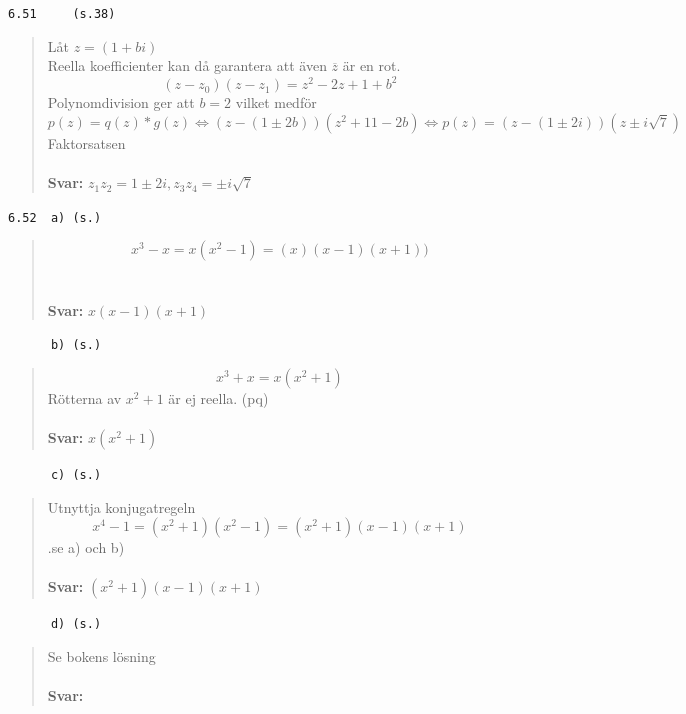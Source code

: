 \documentclass[a4paper]{article}
\newcommand{\tskcol}[1]{\textcolor{tskcol}{#1}}
\begin{document}
	\texttt{\tskcol{6.51~~~~ (s.38)}}
	\begin{quotation}
		\noindent
		Låt $z=(1 + bi)$\\
		Reella koefficienter kan då garantera att även $\overline{z}$ är en rot.\\
		\[(z-z_0)(z-z_1) = z^2-2z+1+b^2\]
		Polynomdivision ger att $b=2$ vilket medför
		\[p(z) = q(z) * g(z)\Leftrightarrow (z-(1\pm 2b))(z^2+11-2b)
		\Leftrightarrow p(z) = (z-(1\pm 2i))(z \pm i \sqrt{7})	
		\]
		Faktorsatsen	
		\\ \\
		\textbf{Svar:} $z_1z_2=1\pm2i,z_3z_4=\pm i \sqrt{7}$
	\end{quotation}
	
	\texttt{\tskcol{6.52~~a) (s.)}}
	\begin{quotation}
		\noindent
		\[x^3-x = x(x^2-1) = (x)(x-1)(x+1))\]
		\\ \\
		\textbf{Svar:} $x(x-1)(x+1)$
	\end{quotation}
	
	\texttt{\tskcol{~~~~~~b) (s.)}}
	\begin{quotation}
		\noindent
		\[x^3+x = x(x^2+1)\]
		Rötterna av $x^2+1$ är ej reella. (pq)
		\\ \\
		\textbf{Svar:} $x(x^2+1)$
	\end{quotation}
	
	\texttt{\tskcol{~~~~~~c) (s.)}}
	\begin{quotation}
		\noindent
		Utnyttja konjugatregeln
		\[x^4 - 1 = (x^2+1)(x^2-1) = (x^2+1)(x-1)(x+1)\]
		.se a) och b)
		\\ \\
		\textbf{Svar:} $(x^2+1)(x-1)(x+1)$
	\end{quotation}
	
	\texttt{\tskcol{~~~~~~d) (s.)}}
	\begin{quotation}
		\noindent
		Se bokens lösning
		\\ \\
		\textbf{Svar:}
	\end{quotation}
	
\end{document}
